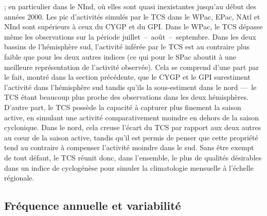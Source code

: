 \documentclass[../main.tex]{subfiles}
\begin{document}
\parencite{schreck_impact_2014} ; en particulier dans le NInd, où elles sont quasi inexistantes jusqu'au début des années 2000. Les pic d'activités simulés par
le TCS dans le WPac, EPac, NAtl et NInd sont supérieurs à ceux du CYGP et du GPI. Dans le WPac, le TCS dépasse même les observations sur la période
juillet~--~août~--~septembre. Dans les deux bassins de l'hémisphère sud, l'activité inférée par le TCS est au contraire plus faible que pour les deux autres
indices (ce qui pour le SPac aboutit à une meilleure représentation de l'activité observée). Cela se comprend d'une part par le fait, montré dans la section
précédente, que le CYGP et le GPI surestiment l'activité dans l'hémisphère sud tandis qu'ils la sous-estiment dans le nord ---~le TCS étant beaucoup plus proche
des observations dans les deux hémisphères. D'autre part, le TCS possède la capacité à capturer plus finement la saison active, en simulant une activité
comparativement moindre en dehors de la saison cyclonique. Dans le nord, cela creuse l'écart du TCS par rapport aux deux autres au cœur de la saison active,
tandis qu'il est permis de penser que cette propriété tend au contraire à compenser l'activité moindre dans le sud. Sans être exempt de tout défaut, le TCS
réunit donc, dans l'ensemble, le plus de qualités désirables dans un indice de cyclogénèse pour simuler la climatologie mensuelle à l'échelle régionale.

\subsection*{Fréquence annuelle et variabilité}
\end{document}
